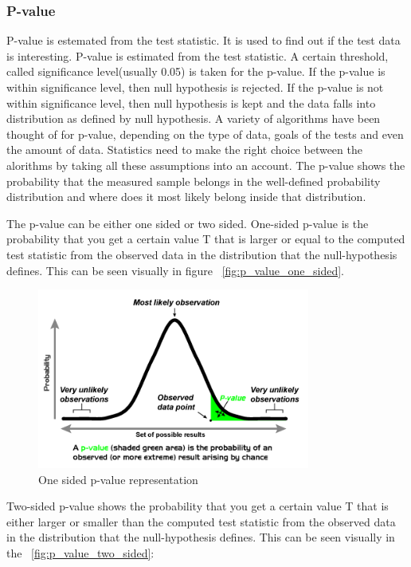 \documentclass[12pt]{article}
\begin{document}
\subsubsection{P-value}
P-value is estemated from the test statistic. It is used to find out if the test data is interesting. P-value is estimated from the test statistic. A certain threshold, called significance level(usually 0.05) is taken for the p-value. If the p-value is within significance level, then null hypothesis is rejected. If the p-value is not within significance level, then null hypothesis is kept and the data falls into distribution as defined by null hypothesis. A variety of algorithms have been thought of for p-value, depending on the type of data, goals of the tests and even the amount of data. Statistics need to make the right choice between the alorithms by taking all these assumptions into an account. The p-value shows the probability that the measured sample belongs in the well-defined probability distribution and where does it most likely belong inside that distribution.

The p-value can be either one sided or two sided. One-sided p-value is the probability that you get a certain value T that is larger or equal to the computed test statistic from the observed data in the distribution that the null-hypothesis defines. This can be seen visually in figure ~\ref{fig:p_value_one_sided}.

\begin{figure}[!h]
  \centering
  \includegraphics[width=0.8\textwidth]{p_value_one_sided}
  \caption{One sided p-value representation}
  \label{fig:p_value_one_sided(Author Repapetilto, Wikipedia Foundation Inc)}
\end{figure}

Two-sided p-value shows the probability that you get a certain value T that is either larger or smaller than the computed test statistic from the observed data in the distribution that the null-hypothesis defines. This can be seen visually in the ~\ref{fig:p_value_two_sided}:
\end{document}
